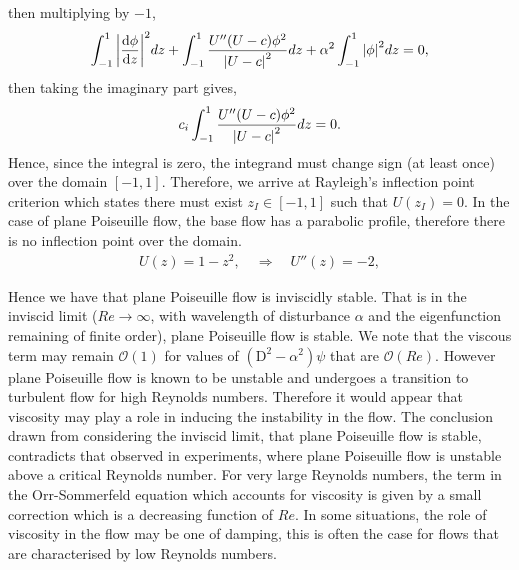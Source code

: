 \documentclass[a4paper, 12pt, twoside, openright]{article}
\numberwithin{equation}{section}
\begin{document}
then multiplying by $-1$,
\begin{align}
\int_{-1}^{1} \abs{\frac{\mathrm{d\phi}}{\mathrm{d}z}}^2 dz + \int_{-1}^1\frac{U''(U-c)\phi^2}{\abs{U-c}^2} dz + \alpha^2\int_{-1}^1\abs{\phi}^2 dz = 0,
\end{align}
then taking the imaginary part gives,
\begin{align}
c_i \int_{-1}^{1} \frac{U''(U-c)\phi^2}{\abs{U-c}^2} dz = 0. 
\end{align}
Hence, since the integral is zero, the integrand must change sign (at least once) over the domain $[-1,1]$. Therefore, we arrive at Rayleigh's inflection point criterion which states there must exist $z_I\in[-1,1]$ such that $U(z_I)=0$. In the case of plane Poiseuille flow, the base flow has a parabolic profile, therefore there is no inflection point over the domain. 
\begin{align}
U(z)=1-z^2, \quad \Rightarrow \quad U''(z)=-2, \nonumber
\end{align} 

Hence we have that plane Poiseuille flow is inviscidly stable. That is in the inviscid limit ($Re\rightarrow\infty$, with wavelength of disturbance $\alpha$ and the eigenfunction remaining of finite order), plane Poiseuille flow is stable. We note that the viscous term may remain $\mathcal{O}(1)$ for values of $(\mathrm{D}^2-\alpha^2)\psi$ that are $\mathcal{O}(Re)$. However plane Poiseuille flow is known to be unstable and undergoes a transition to turbulent flow for high Reynolds numbers. Therefore it would appear that viscosity may play a role in inducing the instability in the flow. The conclusion drawn from considering the inviscid limit, that plane Poiseuille flow is stable, contradicts that observed in experiments, where plane Poiseuille flow is unstable above a critical Reynolds number. For very large Reynolds numbers, the term in the Orr-Sommerfeld equation which accounts for viscosity is given by a small correction which is a decreasing function of $Re$. In some situations, the role of viscosity in the flow may be one of damping, this is often the case for flows that are characterised by low Reynolds numbers. %
\end{document}
